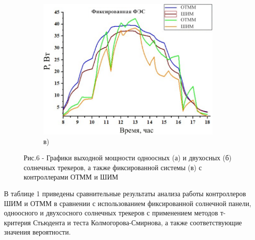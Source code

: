 \begin{figure}[H]
    \begin{subfigure}[b]{0.45\textwidth}
        \centering
        \includegraphics[width=\textwidth]{media/ict/image15}
        \caption*{в)}
    \end{subfigure}
    \caption*{Рис.6 - Графики выходной мощности одноосных (а) и двухосных (б) солнечных трекеров, а также фиксированной системы (в) с контроллерами ОТММ и ШИМ}
\end{figure}


\begin{multicols}{2}
В таблице 1 приведены сравнительные результаты анализа работы
контроллеров ШИМ и ОТММ в сравнении с использованием фиксированной
солнечной панели, одноосного и двухсосного солнечных трекеров с
применением методов т-критерия Стьюдента и теста Колмогорова-Смирнова, а
также соответствующие значения вероятности.
\end{multicols}

